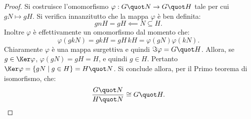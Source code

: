 \documentclass[12pt]{scrartcl}
\begin{document}
	\begin{proof}
		Si costruisce l'omomorfismo $\varphi : G \quot N \to G \quot H$ tale per cui $gN \mapsto gH$. Si verifica innanzitutto
		che la mappa $\varphi$ è ben definita:
		\[ gnH = gH \impliedby N \subseteq H. \]
		Inoltre $\varphi$ è effettivamente un omomorfismo dal momento
		che:
		\[ \varphi(gkN) = gkH = gH \, kH = \varphi(gN) \varphi(kN).  \]
		Chiaramente $\varphi$ è una mappa surgettiva e quindi
		$\Im \varphi = G \quot H$.
		Allora, se $g \in \Ker \varphi$, $\varphi(gN) = gH = H$, e quindi $g \in H$. Pertanto $\Ker \varphi = \{ 
			gN \mid g \in H 
		 \} = H \quot N$. Si conclude allora, per il Primo teorema
		 di isomorfismo, che:
		 \[ \frac{G \quot N}{H \quot N} \cong G \quot H. \]
	\end{proof}
\end{document}
